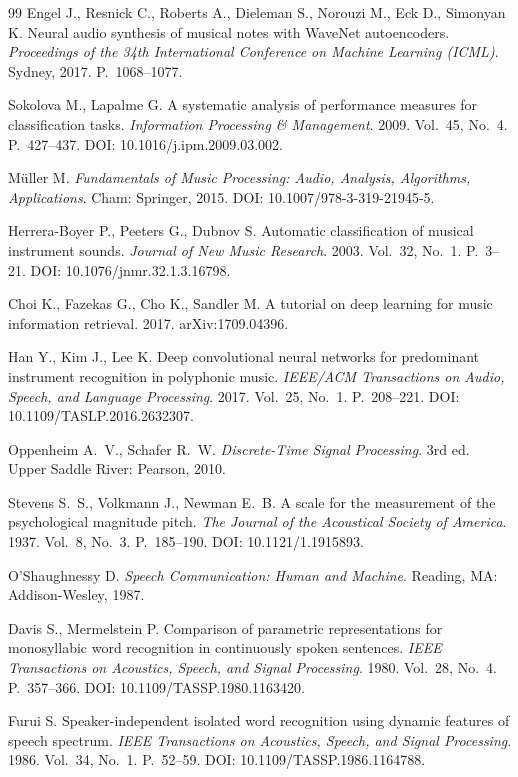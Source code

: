 \begin{thebibliography}{99}
Engel J., Resnick C., Roberts A., Dieleman S., Norouzi M., Eck D., Simonyan K.
Neural audio synthesis of musical notes with WaveNet autoencoders.
\textit{Proceedings of the 34th International Conference on Machine Learning (ICML)}.
Sydney, 2017.
P.~1068--1077.

Sokolova M., Lapalme G.
A systematic analysis of performance measures for classification tasks.
\textit{Information Processing \& Management}.
2009.
Vol.~45, No.~4.
P.~427--437.
DOI: 10.1016/j.ipm.2009.03.002.

M{\"u}ller M.
\textit{Fundamentals of Music Processing: Audio, Analysis, Algorithms, Applications}.
Cham: Springer, 2015.
DOI: 10.1007/978-3-319-21945-5.

Herrera-Boyer P., Peeters G., Dubnov S.
Automatic classification of musical instrument sounds.
\textit{Journal of New Music Research}.
2003.
Vol.~32, No.~1.
P.~3--21.
DOI: 10.1076/jnmr.32.1.3.16798.

Choi K., Fazekas G., Cho K., Sandler M.
A tutorial on deep learning for music information retrieval.
2017.
arXiv:1709.04396.

Han Y., Kim J., Lee K.
Deep convolutional neural networks for predominant instrument recognition in polyphonic music.
\textit{IEEE/ACM Transactions on Audio, Speech, and Language Processing}.
2017.
Vol.~25, No.~1.
P.~208--221.
DOI: 10.1109/TASLP.2016.2632307.

Oppenheim A.~V., Schafer R.~W.
\textit{Discrete-Time Signal Processing}.
3rd ed.
Upper Saddle River: Pearson, 2010.

Stevens S.~S., Volkmann J., Newman E.~B.
A scale for the measurement of the psychological magnitude pitch.
\textit{The Journal of the Acoustical Society of America}.
1937.
Vol.~8, No.~3.
P.~185--190.
DOI: 10.1121/1.1915893.

O'Shaughnessy D.
\textit{Speech Communication: Human and Machine}.
Reading, MA: Addison-Wesley, 1987.

Davis S., Mermelstein P.
Comparison of parametric representations for monosyllabic word recognition in continuously spoken sentences.
\textit{IEEE Transactions on Acoustics, Speech, and Signal Processing}.
1980.
Vol.~28, No.~4.
P.~357--366.
DOI: 10.1109/TASSP.1980.1163420.

Furui S.
Speaker-independent isolated word recognition using dynamic features of speech spectrum.
\textit{IEEE Transactions on Acoustics, Speech, and Signal Processing}.
1986.
Vol.~34, No.~1.
P.~52--59.
DOI: 10.1109/TASSP.1986.1164788.


\end{thebibliography}
